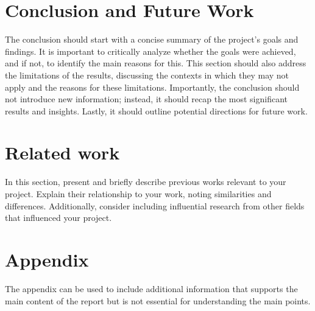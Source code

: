 \documentclass{article}
\begin{document}
\section{Conclusion and Future Work}
The conclusion should start with a concise summary of the project's goals and findings. It is important to critically analyze whether the goals were achieved, and if not, to identify the main reasons for this. This section should also address the limitations of the results, discussing the contexts in which they may not apply and the reasons for these limitations. Importantly, the conclusion should not introduce new information; instead, it should recap the most significant results and insights. Lastly, it should outline potential directions for future work.



\section{Related work}
In this section, present and briefly describe previous works relevant to your project. Explain their relationship to your work, noting similarities and differences. Additionally, consider including influential research from other fields that influenced your project.

\newpage



\newpage

\appendix

\section{Appendix}

The appendix can be used to include additional information that supports the main content of the report but is not essential for understanding the main points.


\end{document}
